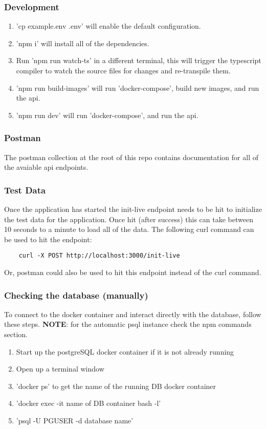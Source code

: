 \subsubsection{Development}
\begin{enumerate}
    \item 'cp example.env .env' will enable the default configuration.
    \item 'npm i' will install all of the dependencies.
    \item Run 'npm run watch-ts' in a different terminal, this will trigger the typescript compiler to watch the source files for changes and re-transpile them.
    \item 'npm run build-images' will run 'docker-compose', build new images, and run the api.
    \item 'npm run dev' will run 'docker-compose', and run the api.
\end{enumerate}

\subsubsection{Postman}
The postman collection at the root of this repo contains documentation for all of the avaiable api endpoints.

\subsubsection{Test Data}
Once the application has started the init-live endpoint needs to be hit to initialize the test data for the application. Once hit (after success) this can take between 10 seconds to a minute to load all of the data. The following curl command can be used to hit the endpoint:
\begin{verbatim}
    curl -X POST http://localhost:3000/init-live
\end{verbatim}
Or, postman could also be used to hit this endpoint instead of the curl command.

\subsubsection{Checking the database (manually)}
To connect to the docker container and interact directly with the database, follow these steps. {\bf NOTE}: for the automatic psql instance check the npm commands section.
\begin{enumerate}
    \item Start up the postgreSQL docker container if it is not already running
    \item Open up a terminal window
    \item 'docker ps' to get the name of the running DB docker container
    \item 'docker exec -it {name of DB container} bash -l'
    \item 'psql -U {PGUSER} -d {database name}'
\end{enumerate}

